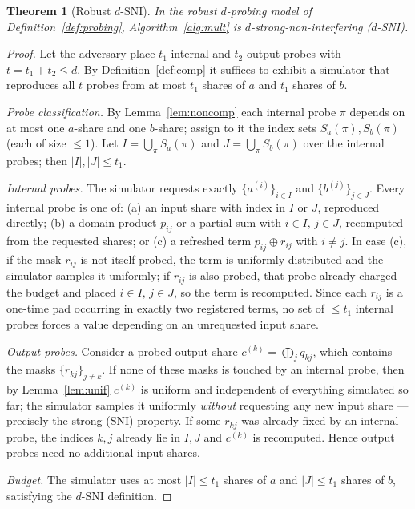 \documentclass[lettersize,journal]{IEEEtran}
\newtheorem{theorem}{Theorem}
\newcommand{\share}[2]{#1^{(#2)}}
\begin{document}
\begin{theorem}[Robust $d$-SNI]
\label{thm:main}
In the robust $d$-probing model of Definition~\ref{def:probing},
Algorithm~\ref{alg:mult} is $d$-strong-non-interfering ($d$-SNI).
\end{theorem}
\begin{proof}
Let the adversary place $t_1$ internal and $t_2$ output probes with
$t=t_1+t_2\le d$. By Definition~\ref{def:comp} it suffices to exhibit a
simulator that reproduces all $t$ probes from at most $t_1$ shares of $a$ and
$t_1$ shares of $b$.

\emph{Probe classification.} By Lemma~\ref{lem:noncomp} each internal probe
$\pi$ depends on at most one $a$-share and one $b$-share; assign to it the index
sets $S_a(\pi),S_b(\pi)$ (each of size $\le 1$). Let
$I=\bigcup_{\pi}S_a(\pi)$ and $J=\bigcup_{\pi}S_b(\pi)$ over the internal probes;
then $|I|,|J|\le t_1$.

\emph{Internal probes.} The simulator requests exactly $\{\share{a}{i}\}_{i\in
I}$ and $\{\share{b}{j}\}_{j\in J}$. Every internal probe is one of:
(a) an input share with index in $I$ or $J$, reproduced directly;
(b) a domain product $p_{ij}$ or a partial sum with $i\in I,\,j\in J$, recomputed
from the requested shares; or
(c) a refreshed term $p_{ij}\oplus r_{ij}$ with $i\neq j$. In case (c), if the
mask $r_{ij}$ is not itself probed, the term is uniformly distributed and the
simulator samples it uniformly; if $r_{ij}$ is also probed, that probe already
charged the budget and placed $i\in I,\,j\in J$, so the term is recomputed.
Since each $r_{ij}$ is a one-time pad occurring in exactly two registered terms,
no set of $\le t_1$ internal probes forces a value depending on an unrequested
input share.

\emph{Output probes.} Consider a probed output share
$\share{c}{k}=\bigoplus_j q_{kj}$, which contains the masks
$\{r_{kj}\}_{j\neq k}$. If none of these masks is touched by an internal probe,
then by Lemma~\ref{lem:unif} $\share{c}{k}$ is uniform and independent of
everything simulated so far; the simulator samples it uniformly \emph{without}
requesting any new input share --- precisely the strong (SNI) property. If some
$r_{kj}$ was already fixed by an internal probe, the indices $k,j$ already lie in
$I,J$ and $\share{c}{k}$ is recomputed. Hence output probes need no additional
input shares.

\emph{Budget.} The simulator uses at most $|I|\le t_1$ shares of $a$ and
$|J|\le t_1$ shares of $b$, satisfying the $d$-SNI definition.
\end{proof}
\end{document}
